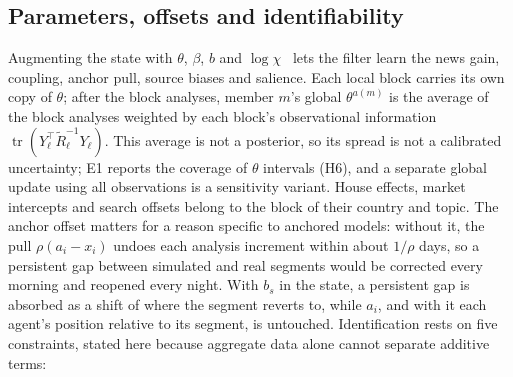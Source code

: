 \documentclass[10pt]{article}
\theoremstyle{remark}
\newcommand{\tr}{\operatorname{tr}}
\begin{document}
\subsection{Parameters, offsets and identifiability}
\label{sec:params}
Augmenting the state with $\theta$, $\beta$, $b$ and $\log\chi$~\cite{evensen2009,ruiz2013} lets the filter learn the news gain, coupling, anchor pull, source biases and salience. Each local block carries its own copy of $\theta$; after the block analyses, member $m$'s global $\theta^{a(m)}$ is the average of the block analyses weighted by each block's observational information $\tr(Y_\ell^\top\tilde R_\ell^{-1}Y_\ell)$. This average is not a posterior, so its spread is not a calibrated uncertainty; E1 reports the coverage of $\theta$ intervals (H6), and a separate global update using all observations is a sensitivity variant. House effects, market intercepts and search offsets belong to the block of their country and topic. The anchor offset matters for a reason specific to anchored models: without it, the pull $\rho(a_i-x_i)$ undoes each analysis increment within about $1/\rho$ days, so a persistent gap between simulated and real segments would be corrected every morning and reopened every night. With $b_s$ in the state, a persistent gap is absorbed as a shift of where the segment reverts to, while $a_i$, and with it each agent's position relative to its segment, is untouched. Identification rests on five constraints, stated here because aggregate data alone cannot separate additive terms:
\end{document}
